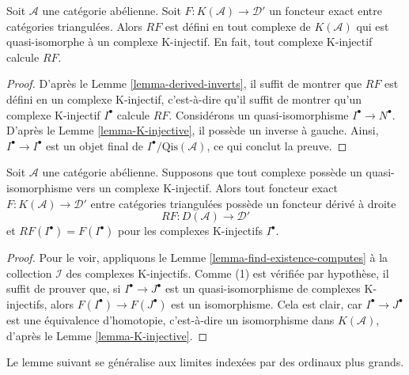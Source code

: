 \begin{lemma}
\label{lemma-K-injective-defined}
Soit $\mathcal{A}$ une catégorie abélienne.
Soit $F : K(\mathcal{A}) \to \mathcal{D}'$ un foncteur exact entre catégories
triangulées. Alors $RF$ est défini en tout complexe de $K(\mathcal{A})$ qui
est quasi-isomorphe à un complexe K-injectif. En fait, tout complexe
K-injectif calcule $RF$.
\end{lemma}

\begin{proof}
D'après le Lemme \ref{lemma-derived-inverts}, il suffit de montrer que $RF$
est défini en un complexe K-injectif, c'est-à-dire qu'il suffit de montrer
qu'un complexe K-injectif $I^\bullet$ calcule $RF$.
Considérons un quasi-isomorphisme $I^\bullet \to N^\bullet$. D'après le
Lemme \ref{lemma-K-injective}, il possède un inverse à gauche.
Ainsi, $I^\bullet \to I^\bullet$ est un objet final de
$I^\bullet/\text{Qis}(\mathcal{A})$, ce qui conclut la preuve.
\end{proof}

\begin{lemma}
\label{lemma-enough-K-injectives-implies}
Soit $\mathcal{A}$ une catégorie abélienne.
Supposons que tout complexe possède un quasi-isomorphisme vers un complexe
K-injectif. Alors tout foncteur exact
$F : K(\mathcal{A}) \to \mathcal{D}'$ entre catégories triangulées possède un
foncteur dérivé à droite
$$
RF : D(\mathcal{A}) \longrightarrow \mathcal{D}'
$$
et $RF(I^\bullet) = F(I^\bullet)$ pour les complexes K-injectifs
$I^\bullet$.
\end{lemma}

\begin{proof}
Pour le voir, appliquons le Lemme \ref{lemma-find-existence-computes} à la
collection $\mathcal{I}$ des complexes K-injectifs. Comme (1) est vérifiée par
hypothèse, il suffit de prouver que, si $I^\bullet \to J^\bullet$ est un
quasi-isomorphisme de complexes K-injectifs, alors
$F(I^\bullet) \to F(J^\bullet)$ est un isomorphisme. Cela est clair, car
$I^\bullet \to J^\bullet$ est une équivalence d'homotopie, c'est-à-dire un
isomorphisme dans $K(\mathcal{A})$, d'après le
Lemme \ref{lemma-K-injective}.
\end{proof}

\noindent
Le lemme suivant se généralise aux limites indexées par des ordinaux plus
grands.

